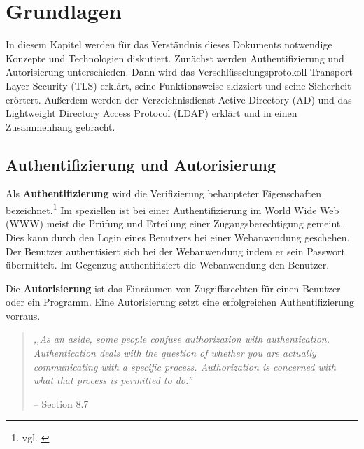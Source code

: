 \documentclass[12pt,a4paper,pointednumbers,abstracton]{scrartcl}
\begin{document}

\newpage
\section{Grundlagen}
\label{sec:basics}

In diesem Kapitel werden für das Verständnis dieses Dokuments notwendige Konzepte und Technologien diskutiert.
Zunächst werden Authentifizierung und Autorisierung unterschieden.
Dann wird das Verschlüsselungsprotokoll Transport Layer Security (TLS) erklärt, seine Funktionsweise skizziert und seine Sicherheit erörtert.
Außerdem werden der Verzeichnisdienst Active Directory (AD) und das Lightweight Directory Access Protocol (LDAP) erklärt und in einen Zusammenhang gebracht.

\subsection{Authentifizierung und Autorisierung}

Als \textbf{Authentifizierung} wird die Verifizierung behaupteter Eigenschaften bezeichnet.\footnote{vgl. \cite[Section 8.7]{TW10}}
Im speziellen ist bei einer Authentifizierung im World Wide Web (WWW) meist die Prüfung und Erteilung einer Zugangsberechtigung gemeint.
Dies kann durch den Login eines Benutzers bei einer Webanwendung geschehen.
Der Benutzer authentisiert sich bei der Webanwendung indem er sein Passwort übermittelt.
Im Gegenzug authentifiziert die Webanwendung den Benutzer.

Die \textbf{Autorisierung} ist das Einräumen von Zugriffsrechten für einen Benutzer oder ein Programm.
Eine Autorisierung setzt eine erfolgreichen Authentifizierung vorraus.

\begin{quote}
\emph{,,As an aside, some people confuse authorization with authentication.
Authentication deals with the question of whether you are actually communicating with a specific process.
Authorization is concerned with what that process is permitted to do.''}
\begin{flushright}
\small{-- \cite{TW10} Section 8.7}
\end{flushright}
\end{quote}
\end{document}
